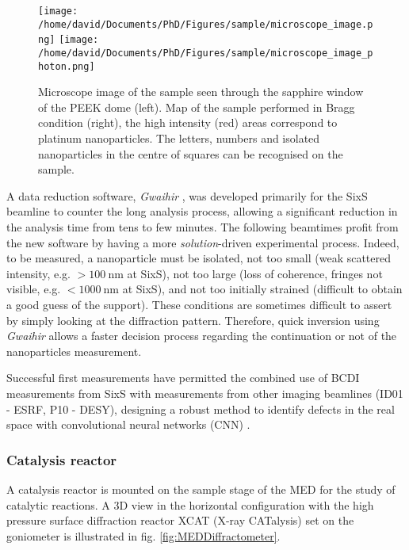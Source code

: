 \begin{figure}[!htb]
    \centering
    \texttt{[image: /home/david/Documents/PhD/Figures/sample/microscope\_image.png]}
    \texttt{[image: /home/david/Documents/PhD/Figures/sample/microscope\_image\_photon.png]}
    \caption{
        Microscope image of the sample seen through the sapphire window of the PEEK dome (left).
        Map of the sample performed in Bragg condition (right), the high intensity (red) areas correspond to platinum nanoparticles.
        The letters, numbers and isolated nanoparticles in the centre of squares can be recognised on the sample.
    }
    \label{fig:SampleMapping}
\end{figure}

A data reduction software, \textit{Gwaihir} \parencite{Simonne2022}, was developed primarily for the SixS beamline to counter the long analysis process, allowing a significant reduction in the analysis time from tens to few minutes.
The following beamtimes profit from the new software by having a more \textit{solution}-driven experimental process.
Indeed, to be measured, a nanoparticle must be isolated, not too small (weak scattered intensity, e.g. $>\qty{100}{\nm}$ at SixS), not too large (loss of coherence, fringes not visible, e.g. $<\qty{1000}{\nm}$ at SixS), and not too initially strained (difficult to obtain a good guess of the support).
These conditions are sometimes difficult to assert by simply looking at the diffraction pattern.
Therefore, quick inversion using \textit{Gwaihir} allows a faster decision process regarding the continuation or not of the nanoparticles measurement.

Successful first measurements have permitted the combined use of BCDI measurements from SixS with measurements from other imaging beamlines (ID01 - ESRF, P10 - DESY), designing a robust method to identify defects in the real space with convolutional neural networks (CNN) \parencite{Lim2021}.

\subsubsection{Catalysis reactor}\label{sec:XCAT}

A catalysis reactor is mounted on the sample stage of the MED for the study of catalytic reactions.
A 3D view in the horizontal configuration with the high pressure surface diffraction reactor XCAT (X-ray CATalysis) set on the goniometer is illustrated in fig. \ref{fig:MEDDiffractometer}.

